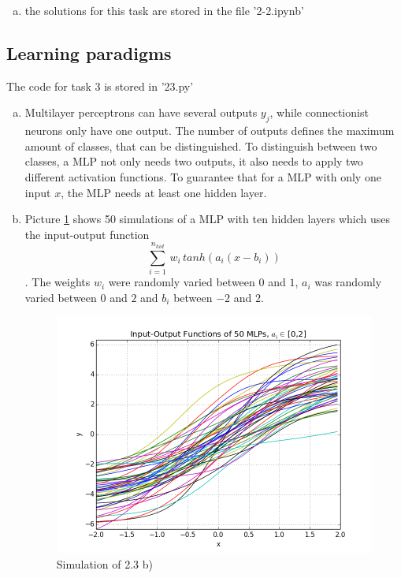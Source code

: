\documentclass[11pt,a4paper]{article}
\begin{document}
\begin{enumerate}[a)]
\item
the solutions for this task are stored in the file '2-2.ipynb'

\end{enumerate}
\subsection*{Learning paradigms}

\small{The code for task 3 is stored in '23.py'}
\begin{enumerate}[a)]
\item
Multilayer perceptrons can have several outputs $y_j$, while connectionist neurons only have one output.
The number of outputs defines the maximum amount of classes, that can be distinguished. To distinguish between two classes,
a MLP not only needs two outputs, it also needs to apply two different activation functions. To guarantee that for a MLP with only
one input $x$, the MLP needs at least one hidden layer.\\



\item

Picture \ref{23b} shows 50 simulations of a MLP with ten hidden layers which uses the input-output function \begin{equation} \sum_{i=1}^{n_{hid}}\,w_i\,tanh(a_i(x-b_i)) \end{equation}. The weights $w_i$ were randomly varied between $0$ and $1$,
$a_i$ was randomly varied between $0$ and $2$ and $b_i$ between $-2$ and $2$.
\begin{figure}[h]
  \centering
  \includegraphics[width=13 cm]{23b.png}
  \caption{Simulation of 2.3 b) }
  \label{23b}
\end{figure}



\end{enumerate}
\end{document}
